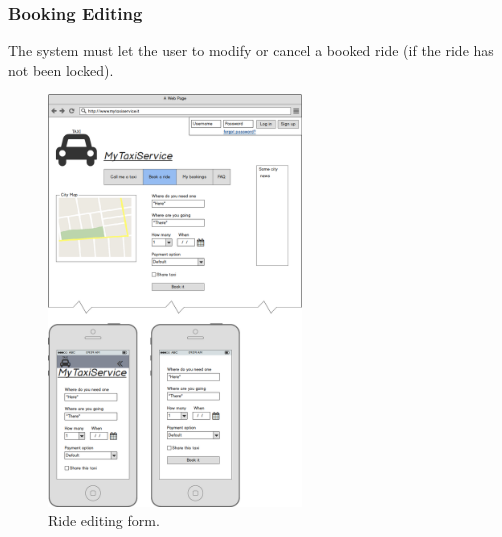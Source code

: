 		\subsubsection {Booking Editing}
			The system must let the user to modify or cancel a booked ride (if the ride has not been locked).
			\begin{figure}[h!]
				\includegraphics[width=0.6\textwidth]{mockup/bookride}
				\caption{Ride editing form.}
			\end{figure}
\newpage
